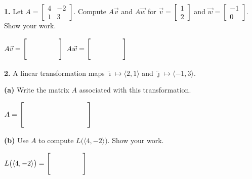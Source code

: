 \documentclass[10pt]{article}
\begin{document}
\namedateperiod
\vspace{0.10in}

\begin{notesbox}
\textbf{1.} Let $A = \begin{bmatrix}4&-2\\1&3\end{bmatrix}$.
Compute $A\vec{v}$ and $A\vec{w}$ for $\vec{v}=\begin{bmatrix}1\\2\end{bmatrix}$
and $\vec{w}=\begin{bmatrix}-1\\0\end{bmatrix}$. Show your work.


\vspace{0.04in}
$A\vec{v} = \begin{bmatrix}\hspace{1.6cm}\\[8pt]\hspace{1.6cm}\end{bmatrix}$
\qquad
$A\vec{w} = \begin{bmatrix}\hspace{1.6cm}\\[8pt]\hspace{1.6cm}\end{bmatrix}$
\end{notesbox}

\vspace{0.10in}

\begin{notesbox}
\textbf{2.} A linear transformation maps $\hat{\imath}\mapsto\langle2,1\rangle$
and $\hat{\jmath}\mapsto\langle-1,3\rangle$.

\vspace{0.06in}
\textbf{(a)} Write the matrix $A$ associated with this transformation.

\vspace{0.08in}
$A = \begin{bmatrix}\hspace{1.4cm}&\hspace{1.4cm}\\[10pt]\hspace{1.4cm}&\hspace{1.4cm}\end{bmatrix}$

\vspace{0.12in}
\textbf{(b)} Use $A$ to compute $L\bigl(\langle4,-2\rangle\bigr)$. Show your work.


$L\bigl(\langle4,-2\rangle\bigr) = \begin{bmatrix}\hspace{1.6cm}\\[8pt]\hspace{1.6cm}\end{bmatrix}$
\end{notesbox}
\end{document}
